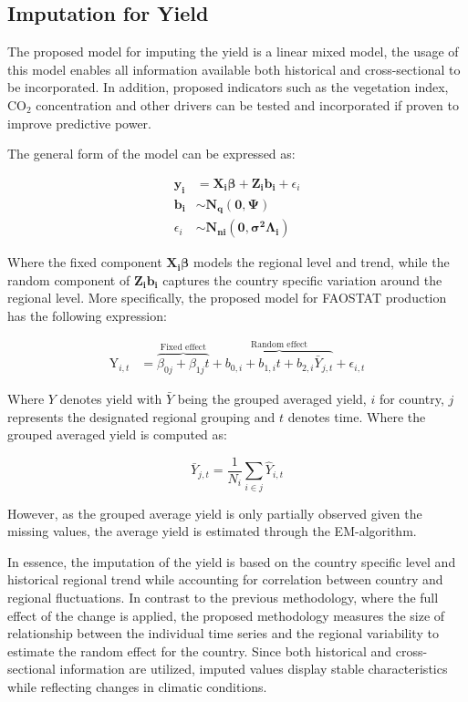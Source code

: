 \documentclass[nojss]{jss}\usepackage{graphicx, color}
\begin{document}
\subsection{Imputation for Yield}
The proposed model for imputing the yield is a linear mixed model, the
usage of this model enables all information available both
historical and cross-sectional to be incorporated. In addition,
proposed indicators such as the vegetation index, $\text{CO}_2$
concentration and other drivers can be tested and incorporated if
proven to improve predictive power.

The general form of the model can be expressed as:

\begin{align}
  \mathbf{y_i} &= \mathbf{X_i}\boldsymbol{\beta} +
  \mathbf{Z_i}\mathbf{b_i} + \epsilon_i \nonumber\\
  \mathbf{b_i} &\sim \mathbf{N_q}(\mathbf{0}, \boldsymbol{\Psi})\nonumber\\
  \epsilon_i &\sim \mathbf{N_{ni}}(\mathbf{0},
  \boldsymbol{\sigma^2}\boldsymbol{\Lambda_i})
\end{align}

Where the fixed component $\mathbf{X_i}\boldsymbol{\beta}$ models the
regional level and trend, while the random component of
$\mathbf{Z_i}\mathbf{b_i}$ captures the country specific variation
around the regional level.  More specifically, the proposed model for
FAOSTAT production has the following expression:

\begin{align}
  \label{eq:lmeImpute}
  \text{Y}_{i,t} &= \overbrace{\beta_{0j} + \beta_{1j}t}^{\text{Fixed
      effect}} + \overbrace{b_{0,i} + b_{1,i}t +
    b_{2,i}\bar{Y}_{j,t}}^{\text{Random effect}} + \epsilon_{i,t}
\end{align}

Where $Y$ denotes yield with $\bar{Y}$ being the grouped averaged
yield, $i$ for country, $j$ represents the designated regional
grouping and $t$ denotes time. Where the grouped averaged yield is
computed as:

\begin{equation}
  \label{eq:averageYield}
  \bar{Y}_{j, t} = \frac{1}{N_i}\sum_{i \in j} \hat{Y}_{i,t}
\end{equation}

However, as the grouped average yield is only partially observed
given the missing values, the average yield is estimated through the
EM-algorithm.


In essence, the imputation of the yield is based on the country
specific level and historical regional trend while accounting for
correlation between country and regional fluctuations. In contrast to
the previous methodology, where the full effect of the change is
applied, the proposed methodology measures the size of relationship
between the individual time series and the regional variability to
estimate the random effect for the country. Since both historical and
cross-sectional information are utilized, imputed values display
stable characteristics while reflecting changes in climatic
conditions.
\end{document}
